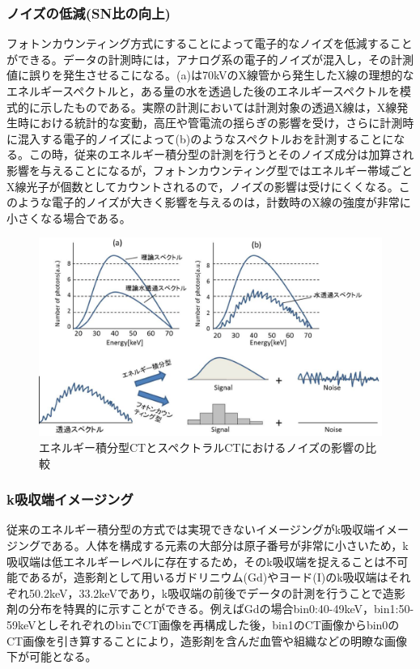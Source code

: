 \subsubsection{ノイズの低減(SN比の向上)\label{sec:pulse_merit}}
フォトンカウンティング方式にすることによって電子的なノイズを低減することができる。データの計測時には，アナログ系の電子的ノイズが混入し，その計測値に誤りを発生させるこになる。(a)は70kVのX線管から発生したX線の理想的なエネルギースペクトルと，ある量の水を透過した後のエネルギースペクトルを模式的に示したものである。実際の計測においては計測対象の透過X線は，X線発生時における統計的な変動，高圧や管電流の揺らぎの影響を受け，さらに計測時に混入する電子的ノイズによって(b)のようなスペクトルおを計測することになる。この時，従来のエネルギー積分型の計測を行うとそのノイズ成分は加算され影響を与えることになるが，フォトンカウンティング型ではエネルギー帯域ごとX線光子が個数としてカウントされるので，ノイズの影響は受けにくくなる。このような電子的ノイズが大きく影響を与えるのは，計数時のX線の強度が非常に小さくなる場合である。

\begin{figure}[H]
 \begin{center}
 \includegraphics[width=12cm]{image/other/noise_affect.eps}
 \end{center}
 \caption{エネルギー積分型CTとスペクトラルCTにおけるノイズの影響の比較\cite{ogawa_kaisetu}}
 \label{fig:noise_affect}
\end{figure}

\subsubsection{k吸収端イメージング}
従来のエネルギー積分型の方式では実現できないイメージングがk吸収端イメージングである。人体を構成する元素の大部分は原子番号が非常に小さいため，k吸収端は低エネルギーレベルに存在するため，そのk吸収端を捉えることは不可能であるが，造影剤として用いるガドリニウム(Gd)やヨード(I)のk吸収端はそれぞれ50.2keV，33.2keVであり，k吸収端の前後でデータの計測を行うことで造影剤の分布を特異的に示すことができる。例えばGdの場合bin0:40-49keV，bin1:50-59keVとしそれぞれのbinでCT画像を再構成した後，bin1のCT画像からbin0のCT画像を引き算することにより，造影剤を含んだ血管や組織などの明瞭な画像下が可能となる。


